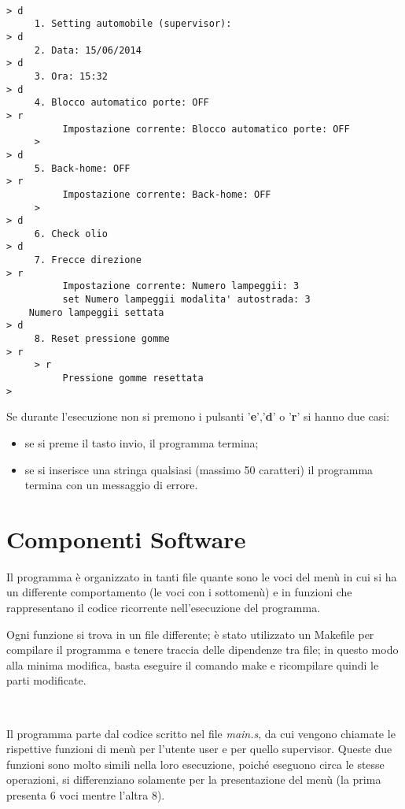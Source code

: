 \documentclass[a4paper,titlepage]{book}
\begin{document}
\begin{lstlisting}

> d
     1. Setting automobile (supervisor):
> d
     2. Data: 15/06/2014
> d
     3. Ora: 15:32
> d
     4. Blocco automatico porte: OFF
> r
          Impostazione corrente: Blocco automatico porte: OFF
     > 
> d
     5. Back-home: OFF
> r
          Impostazione corrente: Back-home: OFF
     >  
> d
     6. Check olio
> d
     7. Frecce direzione
> r
          Impostazione corrente: Numero lampeggii: 3
          set Numero lampeggii modalita' autostrada: 3
	Numero lampeggii settata
> d
     8. Reset pressione gomme
> r
     > r
          Pressione gomme resettata
> 

\end{lstlisting}

Se durante l'esecuzione non si premono i pulsanti '\textbf{e}','\textbf{d}' o '\textbf{r}' si hanno due casi:

\begin{itemize}

\item se si preme il tasto invio, il programma termina;
\item se si inserisce una stringa qualsiasi (massimo 50 caratteri) il programma termina con un messaggio di errore.

\end{itemize}


\chapter{Componenti Software}

Il programma è organizzato in tanti file quante sono le voci del menù in cui si ha un differente comportamento (le voci con i sottomenù) e in funzioni che rappresentano il codice ricorrente nell'esecuzione del programma.

Ogni funzione si trova in un file differente; è stato utilizzato un Makefile per compilare il programma e tenere traccia delle dipendenze tra file; in questo modo alla minima modifica, basta eseguire il comando make e ricompilare quindi le parti modificate.

~

Il programma parte dal codice scritto nel file \textit{main.s}, da cui vengono chiamate le rispettive funzioni di menù per l'utente user e per quello supervisor. Queste due funzioni sono molto simili nella loro esecuzione, poiché eseguono circa le stesse operazioni, si differenziano solamente per la presentazione del menù (la prima presenta 6 voci mentre l'altra 8).
\end{document}
